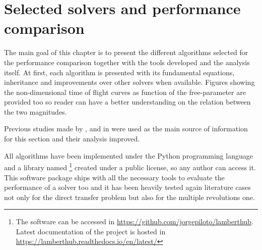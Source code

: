 \chapter{Selected solvers and performance comparison}
\label{performance_chapter}

The main goal of this chapter is to present the different algorithms selected
for the performance comparison together with the tools developed and the
analysis itself. At first, each algorithm is presented with its
fundamental equations, inheritance and improvements over other solvers
when available. Figures showing the non-dimensional time of flight curves as
function of the free-parameter are provided too so reader can have a better
understanding on the relation between the two magnitudes.

Previous studies made by \cite{klumpp1999}, \cite{torre2015} and in
\cite{martinez2021} were used as the main source of information for this section
and their analysis improved.

All algorithms have been implemented under the Python programming language and a
library named \footnote{The software can be accessed
  in
  \href{https://github.com/jorgepiloto/lamberthub}{https://github.com/jorgepiloto/lamberthub}.
  Latest documentation of the project is hosted in
  \href{https://lamberthub.readthedocs.io/en/latest/}{https://lamberthub.readthedocs.io/en/latest/}}
created under a public license, so any author can access it. This software
package ships with all the necessary tools to evaluate the performance of a
solver too and it has been heavily tested again literature cases not only for
the direct transfer problem but also for the multiple revolutions one.




